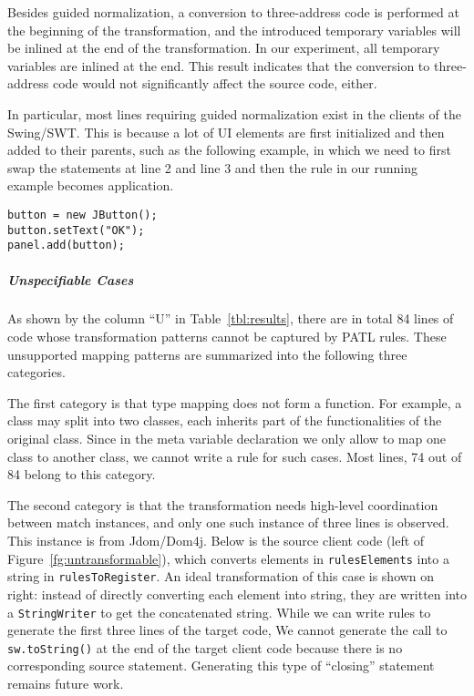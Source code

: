 \documentclass[a4paper, USenglish]{lipics-v2016}
\newenvironment{smpage}[1]
{\begin{lrbox}{\fmbox}\begin{minipage}{#1}}
{\end{minipage}\end{lrbox}\usebox{\fmbox}}
\newcommand{\code}[1]{\texttt{\footnotesize #1}}
\newcommand{\PATL}{PATL\xspace}
\theoremstyle{plain}
\begin{document}
Besides guided normalization, a conversion to three-address code is
performed at the beginning of the transformation, and the introduced
temporary variables will be inlined at the end of the transformation.
In our experiment, all temporary variables are inlined at the end.
This result indicates that the conversion to three-address code would
not significantly affect the source code, either.

In particular,
most lines requiring guided normalization exist in the clients of the
Swing/SWT. This is because a lot of UI elements are first initialized
and then added to their parents, such as the following example, in which we need to first swap the statements at line 2 and line
3 and then the rule in our running example %
becomes application.
\begin{center}
\begin{smpage}{0.3\columnwidth}
\begin{lstlisting}[style=java,frame=none,numbers=none,basicstyle=\ttfamily\scriptsize]
button = new JButton();
button.setText("OK");
panel.add(button);
\end{lstlisting}
\end{smpage}
\end{center}

\subparagraph*{Unspecifiable Cases}
As shown by the column ``U'' in Table~\ref{tbl:results}, there are in
total 84 lines of code whose transformation patterns cannot be
captured by \PATL rules. These unsupported mapping patterns are
summarized into the following three categories.

The first category is that type mapping does not form a function. For example, a class may split into two classes, each inherits part of the functionalities of the original class. Since in the meta variable declaration we only allow to map one class to another class, we cannot write a rule for such cases. Most lines, 74 out of 84 belong to this category. 

The second category is that the transformation needs high-level
coordination between match instances, and only one such instance of
three lines is observed. This instance is from Jdom/Dom4j. Below is the source client code (left of Figure~\ref{fg:untransformable}), which converts elements in \code{rulesElements} into a string in \code{rulesToRegister}. An ideal transformation of this case is shown on right: instead of
directly converting each element into string, they are written into
a \code{StringWriter} to get the concatenated string. While we can write rules to generate the first three lines of the
target code, We cannot generate the call to \code{sw.toString()} at
the end of the target client code because there is no corresponding
source statement. Generating this type of ``closing'' statement
remains future work.
\end{document}
